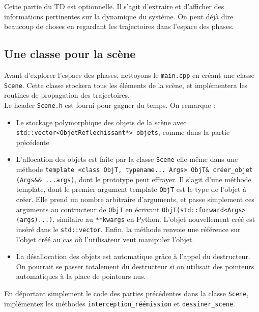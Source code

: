 \documentclass{book}
\newcommand{\inline}[1]{\texttt{#1}}
\def\filename{\texttt}
\begin{document}
Cette partie du TD est optionnelle. Il s'agit d'extraire et d'afficher des informations pertinentes sur la dynamique du système. On peut déjà dire beaucoup de choses en regardant les trajectoires dans l'espace des phases.

\subsection{Une classe pour la scène}

Avant d'explorer l'espace des phases, nettoyons le \filename{main.cpp} en créant une classe \inline{Scene}. Cette classe stockera tous les éléments de la scène, et implémentera les routines de propagation des trajectoires.\\

Le header \filename{Scene.h} est fourni pour gagner du temps. On remarque :
\begin{itemize}
  \item Le stockage polymorphique des objets de la scène avec \inline{std::vector<ObjetReflechissant*> objets}, comme dans la partie précédente
  \item L'allocation des objets est faite par la classe \inline{Scene} elle-même dans une méthode \inline{template <class ObjT, typename... Args> ObjT& créer_objet (Args&& ...args)}, dont le prototype peut effrayer. Il s'agit d'une méthode template, dont le premier argument template \inline{ObjT} est le type de l'objet à créer. Elle prend un nombre arbitraire d'arguments, et passe simplement ces arguments au contructeur de \inline{ObjT} en écrivant \inline{ObjT(std::forward<Args>(args)...)}, similaire au \texttt{**kwargs} en Python. L'objet nouvellement créé est inséré dans le \inline{std::vector}. Enfin, la méthode renvoie une référence sur l'objet créé au cas où l'utilisateur veut manipuler l'objet.
  \item La désallocation des objets est automatique grâce à l'appel du destructeur. On pourrait se passer totalement du destructeur si on utilisait des pointeurs automatiques à la place de pointeurs nus.
\end{itemize}

\vspace{1em}
En déportant simplement le code des parties précédentes dans la classe \inline{Scene}, implémentez les méthodes \inline{interception_réémission} et \inline{dessiner_scene}.\\
\end{document}
